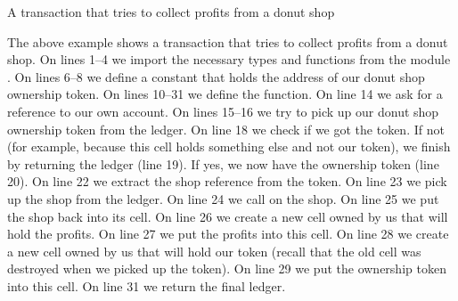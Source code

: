 \begin{example}{A transaction that tries to collect profits from a donut shop}



\end{example}

The above example shows a transaction that tries to collect profits from a donut shop. On lines 1--4 we import the necessary types and functions from the module . On lines 6--8 we define a constant that holds the address of our donut shop ownership token. On lines 10--31 we define the  function. On line 14 we ask for a reference to our own account. On lines 15--16 we try to pick up our donut shop ownership token from the ledger. On line 18 we check if we got the token. If not (for example, because this cell holds something else and not our token), we finish by returning the ledger (line 19). If yes, we now have the ownership token (line 20). On line 22 we extract the shop reference from the token. On line 23 we pick up the shop from the ledger. On line 24 we call  on the shop. On line 25 we put the shop back into its cell. On line 26 we create a new cell owned by us that will hold the profits. On line 27 we put the profits into this cell. On line 28 we create a new cell owned by us that will hold our token (recall that the old cell was destroyed when we picked up the token). On line 29 we put the ownership token into this cell. On line 31 we return the final ledger.

